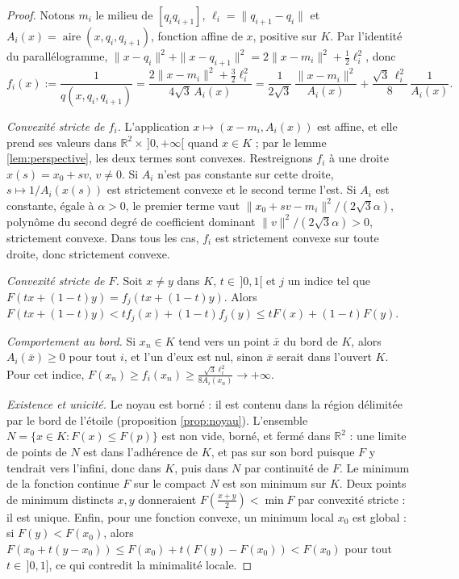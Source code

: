 \documentclass[11pt,a4paper]{article}
\theoremstyle{plain}
\theoremstyle{definition}
\theoremstyle{remark}
\newcommand{\R}{\mathbb{R}}
\DeclareMathOperator{\aire}{aire}
\begin{document}
\begin{proof}
Notons $m_i$ le milieu de $[q_iq_{i+1}]$, $\ell_i=\|q_{i+1}-q_i\|$ et $A_i(x)=\aire(x,q_i,q_{i+1})$, fonction affine de $x$, positive sur $K$. Par l'identité du parallélogramme, $\|x-q_i\|^2+\|x-q_{i+1}\|^2=2\|x-m_i\|^2+\frac12\ell_i^2$, donc
\[
  f_i(x):=\frac1{q(x,q_i,q_{i+1})}=\frac{2\|x-m_i\|^2+\frac32\ell_i^2}{4\sqrt3\,A_i(x)}
  =\frac1{2\sqrt3}\,\frac{\|x-m_i\|^2}{A_i(x)}+\frac{\sqrt3\,\ell_i^2}{8}\,\frac1{A_i(x)}.
\]

\emph{Convexité stricte de $f_i$.} L'application $x\mapsto(x-m_i,A_i(x))$ est affine, et elle prend ses valeurs dans $\R^2\times\,]0,+\infty[$ quand $x\in K$ ; par le lemme \ref{lem:perspective}, les deux termes sont convexes. Restreignons $f_i$ à une droite $x(s)=x_0+sv$, $v\neq0$. Si $A_i$ n'est pas constante sur cette droite, $s\mapsto1/A_i(x(s))$ est strictement convexe et le second terme l'est. Si $A_i$ est constante, égale à $\alpha>0$, le premier terme vaut $\|x_0+sv-m_i\|^2/(2\sqrt3\alpha)$, polynôme du second degré de coefficient dominant $\|v\|^2/(2\sqrt3\alpha)>0$, strictement convexe. Dans tous les cas, $f_i$ est strictement convexe sur toute droite, donc strictement convexe.

\emph{Convexité stricte de $F$.} Soit $x\neq y$ dans $K$, $t\in\,]0,1[$ et $j$ un indice tel que $F(tx+(1-t)y)=f_j(tx+(1-t)y)$. Alors $F(tx+(1-t)y)<tf_j(x)+(1-t)f_j(y)\leq tF(x)+(1-t)F(y)$.

\emph{Comportement au bord.} Si $x_n\in K$ tend vers un point $\bar x$ du bord de $K$, alors $A_i(\bar x)\geq0$ pour tout $i$, et l'un d'eux est nul, sinon $\bar x$ serait dans l'ouvert $K$. Pour cet indice, $F(x_n)\geq f_i(x_n)\geq\frac{\sqrt3\ell_i^2}{8A_i(x_n)}\to+\infty$.

\emph{Existence et unicité.} Le noyau est borné : il est contenu dans la région délimitée par le bord de l'étoile (proposition \ref{prop:noyau}). L'ensemble $N=\{x\in K:F(x)\leq F(p)\}$ est non vide, borné, et fermé dans $\R^2$ : une limite de points de $N$ est dans l'adhérence de $K$, et pas sur son bord puisque $F$ y tendrait vers l'infini, donc dans $K$, puis dans $N$ par continuité de $F$. Le minimum de la fonction continue $F$ sur le compact $N$ est son minimum sur $K$. Deux points de minimum distincts $x,y$ donneraient $F(\frac{x+y}2)<\min F$ par convexité stricte : il est unique. Enfin, pour une fonction convexe, un minimum local $x_0$ est global : si $F(y)<F(x_0)$, alors $F(x_0+t(y-x_0))\leq F(x_0)+t(F(y)-F(x_0))<F(x_0)$ pour tout $t\in\,]0,1]$, ce qui contredit la minimalité locale.
\end{proof}
\end{document}

